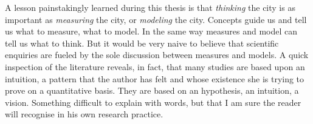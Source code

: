 A lesson painstakingly learned during this thesis is that \emph{thinking} the
city is as important as \emph{measuring} the city, or \emph{modeling} the city.
Concepts guide us and tell us what to measure, what to model. In the same way
measures and model can tell us what to think. But it would be very naive to
believe that scientific enquiries are fueled by the sole discussion between
measures and models. A quick inspection of the literature reveals, in fact, that
many studies are based upon an intuition, a pattern that the author has felt and
whose existence she is trying to prove on a quantitative basis. They are based
on an hypothesis, an intuition, a vision. Something difficult to explain with
words, but that I am sure the reader will recognise in his own research
practice.
